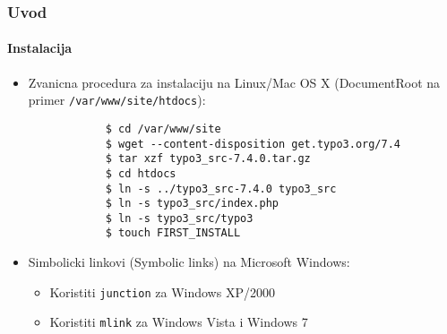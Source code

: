 \begin{frame}[fragile]
	\frametitle{Uvod}
	\framesubtitle{Instalacija}

	\begin{itemize}
		\item Zvanicna procedura za instalaciju na Linux/Mac OS X\newline
			(DocumentRoot na primer \texttt{/var/www/site/htdocs}):
		\begin{lstlisting}
			$ cd /var/www/site
			$ wget --content-disposition get.typo3.org/7.4
			$ tar xzf typo3_src-7.4.0.tar.gz
			$ cd htdocs
			$ ln -s ../typo3_src-7.4.0 typo3_src
			$ ln -s typo3_src/index.php
			$ ln -s typo3_src/typo3
			$ touch FIRST_INSTALL
		\end{lstlisting}

		\item Simbolicki linkovi (Symbolic links) na Microsoft Windows:

			\begin{itemize}
				\item Koristiti \texttt{junction} za Windows XP/2000
				\item Koristiti \texttt{mlink} za Windows Vista i Windows 7
			\end{itemize}

	\end{itemize}
\end{frame}

